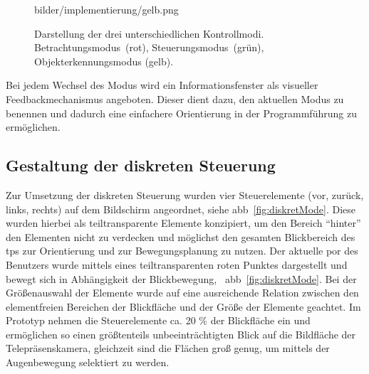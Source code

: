 \begin{figure}[ht]
\begin{center}
\begin{minipage}[b]{.3\linewidth}
      {bilder/implementierung/gelb.png} 
      \label{fig:l3} 
   \end{minipage}%
   \hfill
\end{center}
\caption{Darstellung der drei unterschiedlichen Kontrollmodi. Betrachtungsmodus~(rot), Steuerungsmodus~(grün), Objekterkennungsmodus (gelb).}
\label{fig:modi}
\end{figure}
Bei jedem Wechsel des Modus wird ein Informationsfenster als visueller Feedbackmechanismus angeboten. Dieser dient dazu, den aktuellen Modus zu benennen und dadurch eine einfachere Orientierung in der Programmführung zu ermöglichen.

\subsection{Gestaltung der diskreten Steuerung}
\label{subsection:gestDisk}
Zur Umsetzung der diskreten Steuerung wurden vier Steuerelemente (vor, zurück, links, rechts) auf dem Bildschirm angeordnet, siehe \acs{abb}~\ref{fig:diskretMode}. Diese wurden hierbei als teiltransparente Elemente konzipiert, um den Bereich \enquote{hinter} den Elementen nicht zu verdecken und möglichst den gesamten Blickbereich des \acs{tps} zur Orientierung und zur Bewegungsplanung zu nutzen. Der aktuelle \acs{por} des Benutzers wurde mittels eines teiltransparenten roten Punktes dargestellt und bewegt sich in Abhängigkeit der Blickbewegung, \vgl~\acs{abb}~\ref{fig:diskretMode}. Bei der Größenauswahl der Elemente wurde auf eine ausreichende Relation zwischen den elementfreien Bereichen der Blickfläche und der Größe der Elemente geachtet. Im Prototyp nehmen die Steuerelemente ca. 20 \% der Blickfläche ein und ermöglichen so einen größtenteils unbeeinträchtigten Blick auf die Bildfläche der Telepräsenskamera, gleichzeit sind die Flächen groß genug, um mittels der Augenbewegung selektiert zu werden. 
